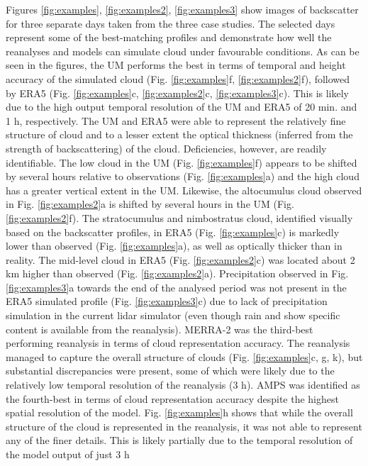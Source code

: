 Figures \ref{fig:examples}, \ref{fig:examples2}, \ref{fig:examples3} show images of backscatter for three separate days taken from
the three case studies. The selected days represent some of the best-matching
profiles and demonstrate how well the reanalyses and models can simulate cloud under
favourable conditions. As can be seen in the figures, 
the UM performs the best
in terms of temporal and height accuracy of the simulated cloud
(Fig. \ref{fig:examples}f, \ref{fig:examples2}f), followed by ERA5
(Fig. \ref{fig:examples}c, \ref{fig:examples2}c, \ref{fig:examples3}c). This is likely
due to the high output temporal resolution of the UM and ERA5 of 20 min. and 1 h,
respectively.
The UM and ERA5 were able to represent the relatively fine structure of cloud and to a lesser extent
the optical thickness (inferred from the strength of backscattering) of the cloud.
Deficiencies, however, are readily
identifiable.
The low cloud in the UM (Fig. \ref{fig:examples}f) appears to be shifted by several
hours relative to observations (Fig. \ref{fig:examples}a) and the high cloud
has a greater vertical extent in the UM. Likewise, the altocumulus cloud
observed in Fig. \ref{fig:examples2}a is shifted by several hours in the UM
(Fig. \ref{fig:examples2}f). The stratocumulus and nimbostratus cloud, identified visually based on the backscatter profiles, in ERA5 (Fig. \ref{fig:examples}c)
is markedly lower than observed (Fig. \ref{fig:examples}a),
as well as optically thicker than in reality.
The mid-level cloud in ERA5 (Fig. \ref{fig:examples2}c) was located about 2 km higher than observed (Fig. \ref{fig:examples2}a).
Precipitation observed in Fig. \ref{fig:examples3}a towards the end of the analysed period was not present in the ERA5
simulated profile (Fig. \ref{fig:examples3}c) due to lack of precipitation simulation
in the current lidar simulator (even though rain and show specific content is available from the reanalysis).
MERRA-2 was the third-best performing
reanalysis in terms of cloud representation accuracy. The reanalysis managed
to capture the overall structure of clouds (Fig. \ref{fig:examples}c, g, k),
but substantial discrepancies were present, some of which were likely due to the
relatively low temporal resolution of the reanalysis (3 h). AMPS was
identified as the fourth-best in terms of cloud representation accuracy despite the highest spatial resolution of the model. Fig.
\ref{fig:examples}h shows that while the overall structure of the cloud is
represented in the reanalysis, it was not able to represent any of the finer
details. This is likely partially due to the temporal resolution of the model output of just 3 h
